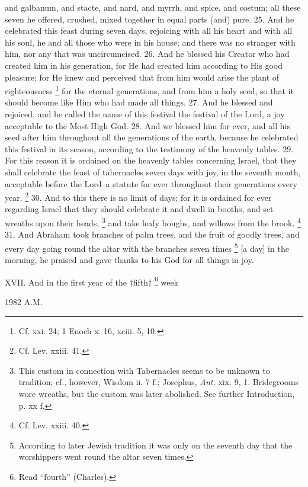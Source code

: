 and galbanum, and stacte, and nard, and myrrh, and spice, and costum; all these seven he offered, crushed, mixed together in equal parts (and) pure. 25. And he celebrated this feast during seven days, rejoicing with all his heart and with all his soul, he and all those who were in his house; and there was no stranger with him, nor any that was uncircumcised. 26. And he blessed his Creator who had created him in his generation, for He had created him according to His good pleasure; for He knew and perceived that from him would arise the plant of righteousness \footnote{Cf. xxi. 24; 1 Enoch x. 16, xciii. 5, 10.} for the eternal generations, and from him a holy seed, so that it should become like Him who had made all things. 27. And he blessed and rejoiced, and he called the name of this festival the festival of the Lord, a joy acceptable to the Most High God. 28. And we blessed him for ever, and all his seed after him throughout all the generations of the earth, because he celebrated this festival in its season, according to the testimony of the heavenly tables. 29. For this reason it is ordained on the heavenly tables concerning Israel, that they shall celebrate the feast of tabernacles seven days with joy, in the seventh month, acceptable before the Lord--a statute for ever throughout their generations every year. \footnote{Cf. Lev. xxiii. 41.} 30. And to this there is no limit of days; for it is ordained for ever regarding Israel that they should celebrate it and dwell in booths, and set wreaths upon their heads, \footnote{This custom in connection with Tabernacles seems to be unknown to tradition; cf., however, Wisdom ii. 7 f.; Josephus, \emph{Ant.} xix. 9, 1. Bridegrooms wore wreaths, but the custom was later abolished. See further Introduction, p. xx f.} and take leafy boughs, and willows from the brook. \footnote{Cf. Lev. xxiii. 40.} 31. And Abraham took branches of palm trees, and the fruit of goodly trees, and every day going round the altar with the branches seven times \footnote{According to later Jewish tradition it was only on the seventh day that the worshippers went round the altar seven times.} [a day] in the morning, he praised and gave thanks to his God for all things in joy.


XVII. And in the first year of the †fifth† \footnote{Read ``fourth'' (Charles).} week

1982 A.M.

